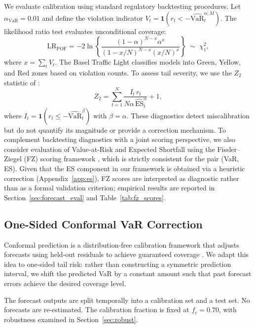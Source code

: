 \documentclass[preprint,11pt,authoryear]{elsarticle}
\newcommand{\VaR}{\mathrm{VaR}}
\newcommand{\ES}{\mathrm{ES}}
\newcommand{\1}{\boldsymbol{1}}
\begin{document}
	We evaluate calibration using standard regulatory backtesting
	procedures. Let $\alpha_{\mathrm{VaR}} = 0.01$ and define the
	violation indicator
	$V_t = \1(r_t < -\widehat{\VaR}_t^{\alpha;M})$. The
	\citet{kupiec1995} likelihood ratio test evaluates
	unconditional coverage:
	\begin{equation}
		\label{eq:kupiec}
		\mathrm{LR}_{\mathrm{POF}} = -2\ln\!\left\{
		\frac{(1-\alpha)^{N-x}\alpha^x}
		{(1-x/N)^{N-x}(x/N)^x}\right\}
		\;\sim\; \chi^2_1,
	\end{equation}
	where $x = \sum_t V_t$. The Basel Traffic Light
	\citep{basel1996} classifies models into Green, Yellow, and
	Red zones based on violation counts. To assess tail severity,
	we use the $Z_2$ statistic of \citet{acerbi2014back}:
	\begin{equation}
		\label{eq:Z2}
		Z_2 = \sum_{t=1}^N
		\frac{I_t\, r_t}{N\alpha\,\widehat{\ES}_t^\alpha} + 1,
	\end{equation}
	where $I_t = \1(r_t \leq -\widehat{\VaR}_t^\beta)$ with $\beta = \alpha$. These
	diagnostics detect miscalibration but do not quantify its
	magnitude or provide a correction mechanism.
	To complement backtesting diagnostics with a joint scoring perspective, we also consider evaluation of Value-at-Risk and Expected Shortfall using the Fissler--Ziegel (FZ) scoring framework \citep{fissler2016higher}, which is strictly consistent for the pair (VaR, ES). Given that the ES component in our framework is obtained via a heuristic correction (Appendix~\ref{app:es}), FZ scores are interpreted as diagnostic rather than as a formal validation criterion; empirical results are reported in Section~\ref{sec:forecast_eval} and Table~\ref{tab:fz_scores}.

	\subsection{One-Sided Conformal VaR Correction}
	\label{sec:cqr_var}
	
	Conformal prediction is a distribution-free calibration
	framework that adjusts forecasts using held-out residuals to
	achieve guaranteed coverage
	\citep{vovk2005algorithmic, romano2019conformalized}. We
	adapt this idea to one-sided tail risk: rather than
	constructing a symmetric prediction interval, we shift the
	predicted VaR by a constant amount such that past forecast
	errors achieve the desired coverage level.
	
	The forecast outputs are split temporally into a calibration
	set and a test set. No forecasts are re-estimated. The
	calibration fraction is fixed at $f_c = 0.70$, with
	robustness examined in Section~\ref{sec:robust}.
	
\end{document}
